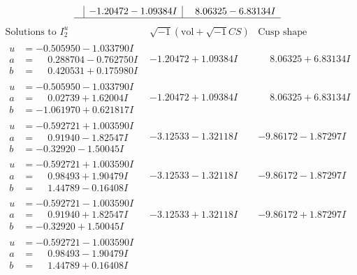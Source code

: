 \documentclass[1p]{elsarticle_modified}
\theoremstyle{definition}
\newcommand{\I}{\sqrt{-1}}
\begin{document}
$$\begin{array}{c|c|c}
 & -1.20472 - 1.09384 I & \phantom{-}8.06325 - 6.83134 I\\
 \hline 
 \end{array}$$\newpage$$\begin{array}{c|c|c}  
\text{Solutions to }I^u_{2}& \I (\text{vol} + \sqrt{-1}CS) & \text{Cusp shape}\\
 \hline 
\begin{aligned}
u &= -0.505950 - 1.033790 I \\
a &= \phantom{-}0.288704 - 0.762750 I \\
b &= \phantom{-}0.420531 + 0.175980 I\end{aligned}
 & -1.20472 + 1.09384 I & \phantom{-}8.06325 + 6.83134 I \\ \hline\begin{aligned}
u &= -0.505950 - 1.033790 I \\
a &= \phantom{-}0.02739 + 1.62004 I \\
b &= -1.061970 + 0.621817 I\end{aligned}
 & -1.20472 + 1.09384 I & \phantom{-}8.06325 + 6.83134 I \\ \hline\begin{aligned}
u &= -0.592721 + 1.003590 I \\
a &= \phantom{-}0.91940 - 1.82547 I \\
b &= -0.32920 - 1.50045 I\end{aligned}
 & -3.12533 - 1.32118 I & -9.86172 - 1.87297 I \\ \hline\begin{aligned}
u &= -0.592721 + 1.003590 I \\
a &= \phantom{-}0.98493 + 1.90479 I \\
b &= \phantom{-}1.44789 - 0.16408 I\end{aligned}
 & -3.12533 - 1.32118 I & -9.86172 - 1.87297 I \\ \hline\begin{aligned}
u &= -0.592721 - 1.003590 I \\
a &= \phantom{-}0.91940 + 1.82547 I \\
b &= -0.32920 + 1.50045 I\end{aligned}
 & -3.12533 + 1.32118 I & -9.86172 + 1.87297 I \\ \hline\begin{aligned}
u &= -0.592721 - 1.003590 I \\
a &= \phantom{-}0.98493 - 1.90479 I \\
b &= \phantom{-}1.44789 + 0.16408 I\end{aligned}

\end{array}$$
\end{document}

